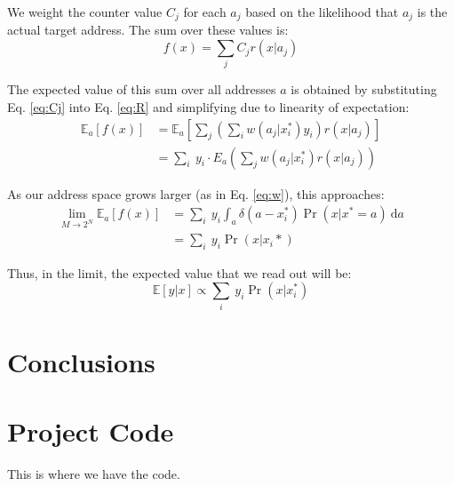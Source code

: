 \documentclass[10pt,letterpaper]{article}
\begin{document}
We weight the counter value $C_j$ for each $a_j$ based on the
likelihood that $a_j$ is the actual target address. The sum over these
values is:
\begin{equation}
f(x)=\sum_j C_j r(x| a_j)
\label{eq:R}
\end{equation}


The expected value of this sum over all addresses $a$ is obtained by
substituting Eq. \ref{eq:Cj} into Eq. \ref{eq:R} and simplifying due
to linearity of expectation:
\begin{align}
\mathbb{E}_a[f(x)]&=\mathbb{E}_a\left[\sum_j\left(\sum_i w(a_j| x_i^*)y_i\right)r(x|a_j)\right]\\
&=\sum_i\ y_i\cdot E_a\left(\sum_j w(a_j| x_i^*)r(x|a_j)\right)
\end{align}

As our address space grows larger (as in Eq. \ref{eq:w}), this approaches:
\begin{align}
\lim_{M\rightarrow 2^N} \mathbb{E}_a[f(x)]&=\sum_i\ y_i \int_a \delta(a-x_i^*)\Pr(x|x^*=a)\ \mathrm{d}a\\
&= \sum_i\ y_i\Pr(x|x_i*)
\end{align}

Thus, in the limit, the expected value that we read out will be:
\begin{equation}
\mathbb{E}[y|x]\propto \sum_i\ y_i\Pr(x|x_i^*)
\end{equation}



\section{Conclusions}



\newpage


\setlength{\bibleftmargin}{.125in}
\setlength{\bibindent}{-\bibleftmargin}




\newpage
\appendix

\section{Project Code}
This is where we have the code.
\end{document}
